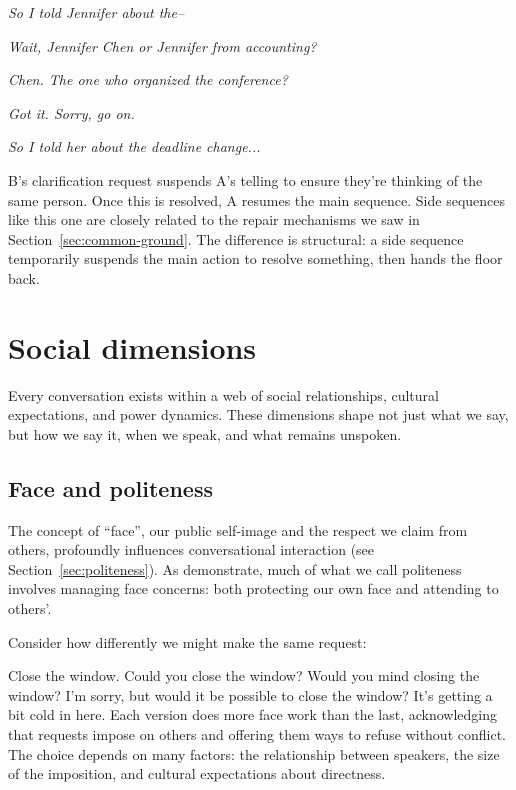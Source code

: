 \ea
\begin{dialogue}
\item[A] \emph{So I told Jennifer about the-- }
\item[B] \emph{Wait, Jennifer Chen or Jennifer from accounting?}
\item[A] \emph{Chen. The one who organized the conference?}
\item[B] \emph{Got it. Sorry, go on.}
\item[A] \emph{So I told her about the deadline change...}
\end{dialogue}
\z
B's clarification request suspends A's telling to ensure they're thinking of the same person. Once this is resolved, A resumes the main sequence. Side sequences like this one are closely related to the repair mechanisms we saw in Section~\ref{sec:common-ground}. The difference is structural: a side sequence temporarily suspends the main action to resolve something, then hands the floor back.

\section{Social dimensions} \label{sec:social}

Every conversation exists within a web of social relationships, cultural expectations, and power dynamics. These dimensions shape not just what we say, but how we say it, when we speak, and what remains unspoken.

\subsection{Face and politeness} \label{subsec:face}

The concept of \enquote{face}, our public self-image and the respect we claim from others, profoundly influences conversational interaction (see Section~\ref{sec:politeness}). As \citet{brown1987} demonstrate, much of what we call politeness involves managing face concerns: both protecting our own face and attending to others'.

Consider how differently we might make the same request:

\ea
\ea Close the window.
\ex Could you close the window?
\ex Would you mind closing the window?
\ex I'm sorry, but would it be possible to close the window? It's getting a bit cold in here.
\z\z
Each version does more face work than the last, acknowledging that requests impose on others and offering them ways to refuse without conflict. The choice depends on many factors: the relationship between speakers, the size of the imposition, and cultural expectations about directness.


